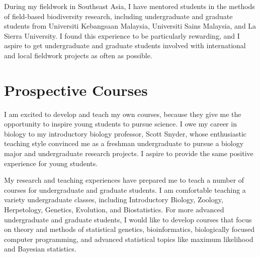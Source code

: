 During my fieldwork in Southeast Asia, I have mentored students in the methods
of field-based biodiversity research, including undergraduate and graduate
students from Universiti Kebangsaan Malaysia, Universiti Sains Malaysia, and La
Sierra University.
I found this experience to be particularly rewarding, and I aspire to get
undergraduate and graduate students involved with international and local
fieldwork projects as often as possible.

\section*{Prospective Courses}

I am excited to develop and teach my own courses, because they give me the
opportunity to inspire young students to pursue science.
I owe my career in biology to my introductory biology professor, Scott Snyder,
whose enthusiastic teaching style convinced me as a freshman undergraduate to
pursue a biology major and undergraduate research projects.
I aspire to provide the same positive experience for young students.

My research and teaching experiences have prepared me to teach a number of
courses for undergraduate and graduate students.
I am comfortable teaching a variety undergraduate classes, including
Introductory Biology, Zoology, Herpetology, Genetics, Evolution, and
Biostatistics.
For more advanced undergraduate and graduate students, I would like to develop
courses that focus on theory and methods of statistical genetics,
bioinformatics, biologically focused computer programming, and advanced
statistical topics like maximum likelihood and Bayesian statistics.

